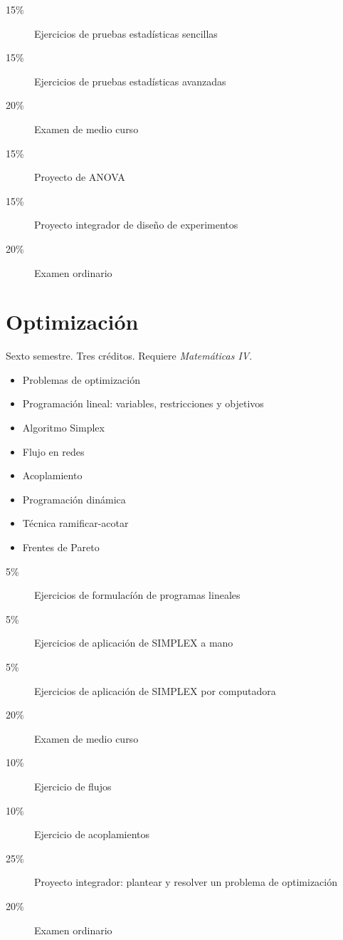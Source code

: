 \documentclass{article}
\begin{document}
\begin{multicols}{4}
\begin{description}
\item[15\%]{Ejercicios de pruebas estad\'{i}sticas sencillas}
\item[15\%]{Ejercicios de pruebas estad\'{i}sticas avanzadas}
\item[20\%]{Examen de medio curso}
\item[15\%]{Proyecto de ANOVA}
\item[15\%]{Proyecto integrador de dise\~{n}o de experimentos}          
\item[20\%]{Examen ordinario}
\end{description}
  
\vfill\null \columnbreak

\hypertarget{o}{\section*{Optimizaci\'{o}n}}  

Sexto semestre. Tres cr\'{e}ditos. Requiere {\em Matem\'{a}ticas IV}.

\begin{itemize}
\item{Problemas de optimizaci\'{o}n}
\item{Programaci\'{o}n lineal: variables, restricciones y objetivos}
\item{Algoritmo Simplex}
\item{Flujo en redes}
\item{Acoplamiento}
\item{Programaci\'{o}n din\'{a}mica}
\item{T\'{e}cnica ramificar-acotar}
\item{Frentes de Pareto}
\end{itemize}

\begin{description}
\item[5\%]{Ejercicios de formulac\'{i}\'{o}n de programas lineales}
\item[5\%]{Ejercicios de aplicaci\'{o}n de SIMPLEX a mano}
\item[5\%]{Ejercicios de aplicaci\'{o}n de SIMPLEX por computadora}  
\item[20\%]{Examen de medio curso}
\item[10\%]{Ejercicio de flujos}
\item[10\%]{Ejercicio de acoplamientos}
\item[25\%]{Proyecto integrador: plantear y resolver un problema de
  optimizaci\'{o}n}
\item[20\%]{Examen ordinario}
\end{description}  


\end{multicols}
\end{document}
